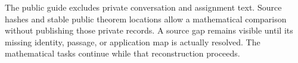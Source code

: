 The public guide excludes private conversation and assignment text.
Source hashes and stable public theorem locations allow a mathematical
comparison without publishing those private records. A source gap remains
visible until its missing identity, passage, or application map is actually
resolved. The mathematical tasks continue while that reconstruction proceeds.
